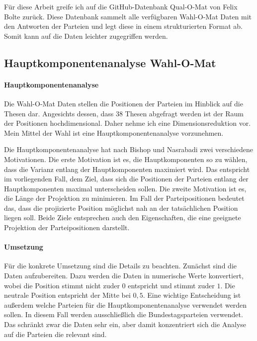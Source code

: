 Für diese Arbeit greife ich auf die GitHub-Datenbank Qual-O-Mat von Felix Bolte \citep{Bolte2022QualOMat} zurück. Diese Datenbank sammelt alle verfügbaren Wahl-O-Mat Daten mit den Antworten der Parteien und legt diese in einem strukturierten Format ab. Somit kann auf die Daten leichter zugegriffen werden.

\subsection{Hauptkomponentenanalyse Wahl-O-Mat}
\paragraph{Hauptkomponentenanalyse}
Die Wahl-O-Mat Daten stellen die Positionen der Parteien im Hinblick auf die Thesen dar. Angesichts dessen, dass 38 Thesen abgefragt werden ist der Raum der Positionen hochdimensional. Daher nehme ich eine Dimensionsreduktion vor. Mein Mittel der Wahl ist eine Hauptkomponentenanalyse vorzunehmen.

Die Hauptkomponentenanalyse hat nach Bishop und Nasrabadi \citep{bishop2006pattern} zwei verschiedene Motivationen. Die erste Motivation ist es, die Hauptkomponenten so zu wählen, dass die Varianz entlang der Hauptkomponenten maximiert wird. Das entspricht im vorliegenden Fall, dem Ziel, dass sich die Positionen der Parteien entlang der Hauptkomponenten maximal unterscheiden sollen. Die zweite Motivation ist es, die Länge der Projektion zu minimieren. Im Fall der Parteipositionen bedeutet das, dass die projizierte Position möglichst nah an der tatsächlichen Position liegen soll. Beide Ziele entsprechen auch den Eigenschaften, die eine geeignete Projektion der Parteipositionen darstellt.

\paragraph{Umsetzung}
Für die konkrete Umsetzung sind die Details zu beachten. Zunächst sind die Daten aufzubereiten. Dazu werden die Daten in numerische Werte konvertiert, wobei die Position \glqq stimmt nicht zu\grqq der $0$ entspricht und \glqq stimmt zu\grqq der $1$. Die neutrale Position entspricht der Mitte bei $0,5$.
Eine wichtige Entscheidung ist außerdem welche Parteien für die Hauptkomponentenanalyse verwendet werden sollen. In diesem Fall werden ausschließlich die Bundestagsparteien verwendet. Das schränkt zwar die Daten sehr ein, aber damit konzentriert sich die Analyse auf die Parteien die relevant sind.

